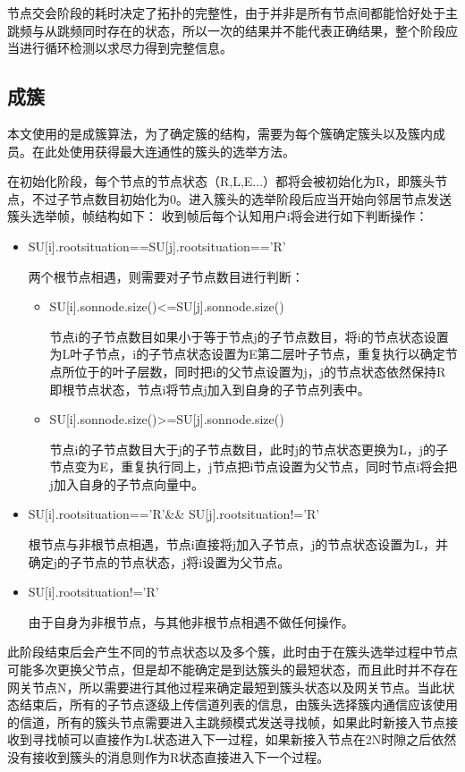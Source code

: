 \documentclass[a4paper,AutoFakeBold,oneside,12pt]{book}
\begin{document}
  节点交会阶段的耗时决定了拓扑的完整性，由于并非是所有节点间都能恰好处于主跳频与从跳频同时存在的状态，所以一次的结果并不能代表正确结果，整个阶段应当进行循环检测以求尽力得到完整信息。
\subsection{成簇}
  本文使用的是成簇算法，为了确定簇的结构，需要为每个簇确定簇头以及簇内成员。在此处使用获得最大连通性的簇头的选举方法。
  
  在初始化阶段，每个节点的节点状态（R,L,E...）都将会被初始化为R，即簇头节点，不过子节点数目初始化为0。进入簇头的选举阶段后应当开始向邻居节点发送簇头选举帧，帧结构如下：
收到帧后每个认知用户i将会进行如下判断操作：
\begin{itemize}
\item {SU[i].rootsituation==SU[j].rootsituation=='R'}

两个根节点相遇，则需要对子节点数目进行判断：
\begin{itemize}
\item {SU[i].sonnode.size()<=SU[j].sonnode.size()}

节点i的子节点数目如果小于等于节点j的子节点数目，将i的节点状态设置为L叶子节点，i的子节点状态设置为E第二层叶子节点，重复执行以确定节点所位于的叶子层数，同时把i的父节点设置为j，j的节点状态依然保持R即根节点状态，节点i将节点j加入到自身的子节点列表中。
\item {SU[i].sonnode.size()>=SU[j].sonnode.size()}

节点i的子节点数目大于j的子节点数目，此时j的节点状态更换为L，j的子节点变为E，重复执行同上，j节点把i节点设置为父节点，同时节点i将会把j加入自身的子节点向量中。

\end{itemize}
\item {SU[i].rootsituation=='R'\&\& SU[j].rootsituation!='R'}
  
  根节点与非根节点相遇，节点i直接将j加入子节点，j的节点状态设置为L，并确定j的子节点的节点状态，j将i设置为父节点。
\item {SU[i].rootsituation!='R'}
  
  由于自身为非根节点，与其他非根节点相遇不做任何操作。
\end{itemize}
  此阶段结束后会产生不同的节点状态以及多个簇，此时由于在簇头选举过程中节点可能多次更换父节点，但是却不能确定是到达簇头的最短状态，而且此时并不存在网关节点N，所以需要进行其他过程来确定最短到簇头状态以及网关节点。当此状态结束后，所有的子节点逐级上传信道列表的信息，由簇头选择簇内通信应该使用的信道，所有的簇头节点需要进入主跳频模式发送寻找帧，如果此时新接入节点接收到寻找帧可以直接作为L状态进入下一过程，如果新接入节点在2N时隙之后依然没有接收到簇头的消息则作为R状态直接进入下一个过程。
\end{document}
